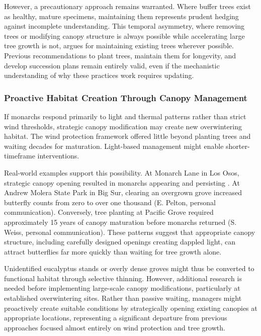 However, a precautionary approach remains warranted. Where buffer trees exist as healthy, mature specimens, maintaining them represents prudent hedging against incomplete understanding. This temporal asymmetry, where removing trees or modifying canopy structure is always possible while accelerating large tree growth is not, argues for maintaining existing trees wherever possible. Previous recommendations to plant trees, maintain them for longevity, and develop succession plans remain entirely valid, even if the mechanistic understanding of why these practices work requires updating.

\subsubsection{Proactive Habitat Creation Through Canopy Management}

If monarchs respond primarily to light and thermal patterns rather than strict wind thresholds, strategic canopy modification may create new overwintering habitat. The wind protection framework offered little beyond planting trees and waiting decades for maturation. Light-based management might enable shorter-timeframe interventions.

Real-world examples support this possibility. At Monarch Lane in Los Osos, strategic canopy opening resulted in monarchs appearing and persisting \parencite{leongRestorationOverwinteringGrove1999,xercessocietyWesternMonarchThanksgiving2025}. At Andrew Molera State Park in Big Sur, clearing an overgrown grove increased butterfly counts from zero to over one thousand (E. Pelton, personal communication). Conversely, tree planting at Pacific Grove required approximately 15 years of canopy maturation before monarchs returned (S. Weiss, personal communication). These patterns suggest that appropriate canopy structure, including carefully designed openings creating dappled light, can attract butterflies far more quickly than waiting for tree growth alone.

Unidentified eucalyptus stands or overly dense groves might thus be converted to functional habitat through selective thinning. However, additional research is needed before implementing large-scale canopy modifications, particularly at established overwintering sites. Rather than passive waiting, managers might proactively create suitable conditions by strategically opening existing canopies at appropriate locations, representing a significant departure from previous approaches focused almost entirely on wind protection and tree growth.

